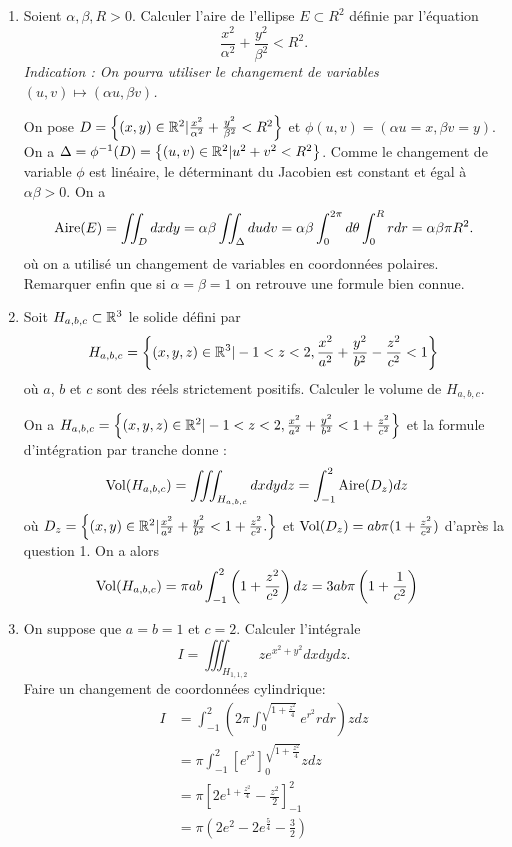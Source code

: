 \documentclass{article}
\begin{document}
\exo{}
\begin{enumerate}
	\item Soient $\alpha, \beta, R > 0$. Calculer l'aire de l'ellipse $E \subset R^2$ définie par l'équation
		\[
			\frac{x^2}{\alpha^2} + \frac{y^2}{\beta^2} < R^2.
		\]
		{\it Indication : On pourra utiliser le changement de variables $(u,v) \mapsto (\alpha u, \beta v)$.}

	\medskip

		On pose $D = \left\{ (x,y) \in\mathbb{R}^2 |	\frac{x^2}{\alpha^2} + \frac{y^2}{\beta^2} < R^2  \right\}$  et $ \phi(u,v) = (\alpha u = x, \beta v = y )$.  On a $\Delta = \phi^{-1}(D) = \left\{ (u,v) \in\mathbb{R}^2 |	u^2 + v^2 < R^2  \right\} $. Comme le changement de variable $\phi $ est linéaire,  le déterminant du Jacobien est constant et égal à $\alpha\beta>0$. On a 
\[
	\operatorname{Aire}(E) = \iint_D dx dy = \alpha\beta \iint_\Delta dudv = \alpha\beta \int_0^{2\pi}d\theta \int_0^R rdr = \alpha\beta\pi R^2.
\]
où on a utilisé un changement de variables en coordonnées polaires. Remarquer enfin que si $\alpha = \beta =1$ on retrouve une formule bien connue.

	\medskip

	\item Soit $H_{a,b,c} \subset \mathbb{R}^3$ le solide défini par
\[
	H_{a,b,c} = \left\{  (x,y,z) \in \mathbb{R}^3 | -1 < z <2, \frac{x^2}{a^2} + \frac{y^2}{b^2} - \frac{z^2}{c^2} <1 \right\}
\]
		où $a$, $b$ et $c$ sont des réels strictement positifs. Calculer le volume de $H_{a,b,c}$.

	\medskip

On a $ 
	H_{a,b,c} = \left\{  (x,y,z) \in \mathbb{R}^2 | -1 < z <2, \frac{x^2}{a^2} + \frac{y^2}{b^2} < 1+ \frac{z^2}{c^2}  \right\}
$ et la formule d'intégration par tranche donne :
\begin{align*}
	\operatorname{Vol}(H_{a,b,c}) & = \iiint_{H_{a,b,c}} dxdydz = \int_{-1}^2 \operatorname{Aire}(D_z) dz
\end{align*}
où $D_z = \left\{ (x,y) \in\mathbb{R}^2 | \frac{x^2}{a^2} + \frac{y^2}{b^2} < 1 + \frac{z^2}{c^2}.
 \right\}$ et $\operatorname{Vol}(D_z) = ab\pi(1 + \frac{z^2}{c^2} )$ d'après la question 1. On a alors
 \begin{align*}
	 \operatorname{Vol}(H_{a,b,c}) & = \pi ab\int_{-1}^2 \left(1+\frac{z^2}{c^2}\right)  dz = 3ab\pi\left( 1+ \frac{1}{c^2} \right)
 \end{align*}


	\item On suppose que $a = b = 1$ et $c = 2$. Calculer l'intégrale
		\[
			I = \iiint_{H_{1,1,2}} z e^{x^2+y^2}dxdydz.
		\]
		Faire un changement de coordonnées cylindrique:
\begin{align*}
	I &= \int_{-1}^2 \left( 2\pi \int_0^{\sqrt{1+ \frac{z^2}{4} }}  e^{r^2} rdr \right)zdz \\
	 & =  \pi \int_{-1}^{2} \left[ e^{r^2} \right]_0^{\sqrt{1+ \frac{z^2}{4} }}z dz \\
	 & = \pi \left[  2e^{1+ \frac{z^2}{4} } - \frac{z^2}{2}  \right]_{-1}^{2}  \\
	 & = \pi (2e^2 -2e^{\frac 5 4} - \frac 3 2)
\end{align*}
\end{enumerate}
\end{document}
